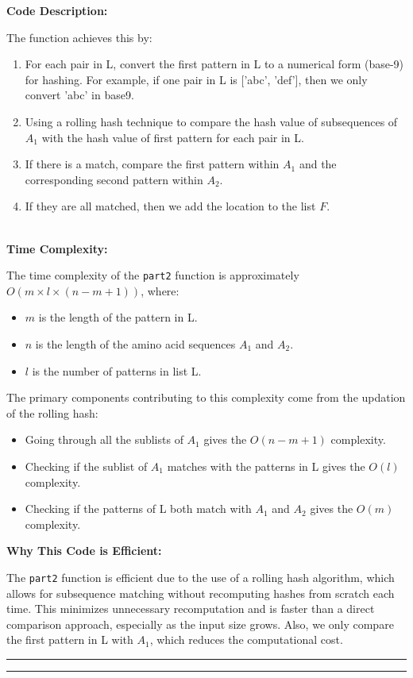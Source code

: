\documentclass{article}
\begin{document}
\textbf{Code Description:}

The function achieves this by:
\begin{enumerate}
    \item For each pair in L, convert the first pattern in L to a numerical form (base-9) for hashing. For example, if one pair in L is ['abc', 'def'], then we only convert 'abc' in base9. 
    \item Using a rolling hash technique to compare the hash value of subsequences of $A_1$ with the hash value of first pattern for each pair in L.
    \item If there is a match, compare the first pattern within $A_1$ and the corresponding second pattern within $A_2$.
    \item If they are all matched, then we add the location to the list $F$.
\end{enumerate} \\

\textbf{Time Complexity:}

The time complexity of the \texttt{part2} function is approximately $ O(m \times l \times ( n-m+1 )) $, where:
\begin{itemize}
    \item \( m \) is the length of the pattern in L.
    \item \( n \) is the length of the amino acid sequences $A_1$ and $A_2$.
    \item \( l \) is the number of patterns in list L.
\end{itemize}

The primary components contributing to this complexity come from the updation of the rolling hash:
\begin{itemize}
    \item Going through all the sublists of $A_1$ gives the $O(n-m+1)$ complexity.
    \item Checking if the sublist of $A_1$ matches with the patterns in L gives the $O(l)$ complexity.
    \item Checking if the patterns of L both match with $A_1$ and $A_2$ gives the $O(m)$ complexity.
\end{itemize}


\textbf{Why This Code is Efficient:}

The \texttt{part2} function is efficient due to the use of a rolling hash algorithm, which allows for subsequence matching without recomputing hashes from scratch each time. This minimizes unnecessary recomputation and is faster than a direct comparison approach, especially as the input size grows. Also, we only compare the first pattern in L with $A_1$, which reduces the computational cost.




\hrule
\hrule



\end{document}

